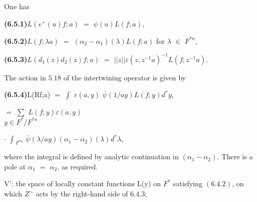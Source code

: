 \documentclass[10pt,a4paper]{article}
\begin{document}
\clearpage
{}
\label{d035-physical-030}
\par One has\par
\par\noindent\textbf{(6.5.1)}\quad $L(e^+(u)f;a)$ $=$ $\psi{}(u)L(f;a)$,\par
\par\noindent\textbf{(6.5.2)}\quad $L(f;\lambda{}a)$ $=$ $(\alpha{}_2-\alpha{}_1)(\lambda{})L(f;a)$ for $\lambda{}$ $\in{}$ $F^{*n}$,\par
\par\noindent\textbf{(6.5.3)}\quad $L(d_1(z)d_2(z)f;a)$ $=$ $||z||\varepsilon{}(z,z^{-1}a)^{-1}L(f;z^{-1}a)$.\par
\par The action in $5.18$ of the intertwining operator is given by\par
\par\noindent\textbf{(6.5.4)}\quad L(Rf;a) $=$ $\int{}$ $\varepsilon{}(a,y)$ $\overline{\psi{}}(1/ay)L(f;y)d^*y$,\par
\par\smallskip\begin{center}\begin{minipage}{0.96\textwidth}\centering
$=$ $\sum{}$ $L(f;y)\varepsilon{}(a,y)$ \\ $y\in{}F^*/F^{*n}$
\end{minipage}\end{center}\smallskip
\par\smallskip\begin{center}\begin{minipage}{0.96\textwidth}\centering
$\cdot{}$ $\int{}_{F^{*n}}$ $\overline{\psi{}}(\lambda{}/ay)(\alpha{}_1-\alpha{}_2)(\lambda{})d^*\lambda{}$,
\end{minipage}\end{center}\smallskip
\par where the integral is defined by analytic continuation in $(\alpha{}_1-\alpha{}_2)$. There is a pole at $\alpha{}_1$ $=$ $\alpha{}_2$, as required.\par
\par\medskip{}\par\smallskip
\par V': the space of locally constant functions L(y) on $F^*$ satisfying $(6.4.2)$, on which $Z^\sim$ acts by the right-hand side of $6.4.3$;\par
\end{document}

